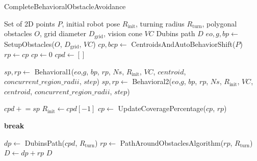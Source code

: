 \begin{algorithm}[H]
    \caption{CompleteBehavioralObstacleAvoidance}
    \label{alg:complete_behavioral_obstacle_avoidance}
    \begin{algorithmic}[1]
    \Require Set of 2D points $P$, initial robot pose $R_{\text{init}}$, turning radius $R_{\text{turn}}$, polygonal obstacles $O$, grid diameter $D_{\text{grid}}$, vision cone $VC$
    \Ensure Dubins path $D$
    \State $eo, g, bp \leftarrow$ SetupObstacles($O$, $D_{\text{grid}}$, $VC$)
    \State $cp, bcp \leftarrow$ CentroidsAndAutoBehaviorShift($P$)
    \State $rp \leftarrow cp$
    \State $cp \leftarrow 0$
    \State $cpd \leftarrow []$
    
            \State $sp, rp \leftarrow$ Behavioral1($eo$,$g$, $bp$, $rp$, $Ns$, $R_{\text{init}}$, $VC$, $centroid$, $concurrent\_region\_radii$, $step$)
        \Else
            \State $sp, rp \leftarrow$ Behavioral2($eo$,$g$, $bp$, $rp$, $Ns$, $R_{\text{init}}$, $VC$, $centroid$, $concurrent\_region\_radii$, $step$)
        \EndIf
        
        \State $cpd \mathrel{+}= sp$
        \State $R_{\text{init}} \leftarrow cpd[-1]$
        \State $cp \leftarrow$ UpdateCoveragePercentage($cp$, $rp$)
        
            \State \textbf{break}
        \EndIf
    \EndWhile
    
    \State $dp \leftarrow$ DubinsPath($cpd$, $R_{\text{turn}}$)
    \State $rp \leftarrow$ PathAroundObstaclesAlgorithm($rp$, $R_{\text{turn}}$)
    \State $D \leftarrow dp + rp$
    \State \Return $D$
    \end{algorithmic}
    \end{algorithm}
    

